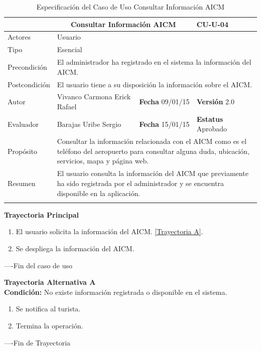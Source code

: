 \begin{longtable}{|p{2.5cm}|p{6.4cm}|p{2cm}|p{2cm}|}
	\hline
		\rowcolor[RGB]{51,153,255}{Caso de Uso}&\multicolumn{2}{c}{Consultar Información AICM}&{\textbf{CU-U-04}}\\
	\hline
		{Actores}&\multicolumn{3}{p{11.2cm}|}{Usuario}\\
	\hline
		{Tipo}&\multicolumn{3}{p{11.2cm}|}{Esencial}\\
	\hline
		{Precondición}&\multicolumn{3}{p{11.2cm}|}{El administrador ha registrado en el sistema la información del AICM.}\\
	\hline
		{Postcondición}&\multicolumn{3}{p{11.2cm}|}{El usuario tiene a su disposición la información sobre el AICM.}\\
	\hline
		{Autor}&{Vivanco Carmona Erick Rafael}&{\textbf{Fecha} 09/01/15}&{\textbf{Versión} 2.0}\\
			\hline
		{Evaluador}&{Barajas Uribe Sergio}&{\textbf{Fecha} 15/01/15}&{\textbf{Estatus} Aprobado}\\
	\hline
		{Propósito}&\multicolumn{3}{p{11.2cm}|}{Consultar la información relacionada con el AICM como es el teléfono del aeropuerto para consultar alguna duda, ubicación, servicios, mapa y página web.}\\
	\hline
		{Resumen}&\multicolumn{3}{p{11.2cm}|}{El usuario consulta la información del AICM que previamente ha sido registrada por el administrador y se encuentra disponible en la aplicación.}\\	
	\hline
	\caption[Especificación del Caso de Uso Consultar Información AICM]{Especificación del Caso de Uso Consultar Información AICM}
    	\label{tab:cuConsultarInformacionAICM}
\end{longtable}

\begin{flushleft}
	\textbf{Trayectoria Principal}\\
	\begin{enumerate}
		\item El usuario solicita la información del AICM. \hyperlink{TrayectoriaA_CU-U-04}{[Trayectoria A]}.
		\item Se despliega la información del AICM.
	\end{enumerate}
\end{flushleft}
----Fin del caso de uso

\begin{flushleft}
	\hypertarget{TrayectoriaA_CU-U-04}{}
	\textbf{Trayectoria Alternativa A}\\
	\textbf{Condición:} No existe información registrada o disponible en el sistema. \\
	\begin{enumerate}
		\item  Se notifica al turista. 
		\item Termina la operación.
	\end{enumerate}
\end{flushleft}
----Fin de Trayectoria
\clearpage

